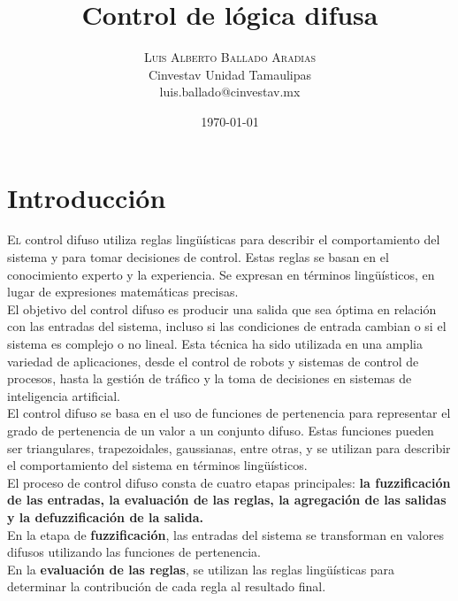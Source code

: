 \documentclass[oneside,onecolumn]{article}
\title{Control de lógica difusa} %
\author{%
\textsc{Luis Alberto Ballado Aradias} \\%
\normalsize Cinvestav Unidad Tamaulipas \\ %
\normalsize luis.ballado@cinvestav.mx %
}
\date{\today} %
\begin{document}
\maketitle

\section{Introducción}

\lettrine[nindent=0em,lines=3]{E}l control difuso utiliza reglas lingüísticas para describir el comportamiento del sistema y para tomar decisiones de control. Estas reglas se basan en el conocimiento experto y la experiencia. Se expresan en términos lingüísticos, en lugar de expresiones matemáticas precisas.\\

El objetivo del control difuso es producir una salida que sea óptima en relación con las entradas del sistema, incluso si las condiciones de entrada cambian o si el sistema es complejo o no lineal. Esta técnica ha sido utilizada en una amplia variedad de aplicaciones, desde el control de robots y sistemas de control de procesos, hasta la gestión de tráfico y la toma de decisiones en sistemas de inteligencia artificial.\\

El control difuso se basa en el uso de funciones de pertenencia para representar el grado de pertenencia de un valor a un conjunto difuso. Estas funciones pueden ser triangulares, trapezoidales, gaussianas, entre otras, y se utilizan para describir el comportamiento del sistema en términos lingüísticos.\\

El proceso de control difuso consta de cuatro etapas principales: \textbf{la fuzzificación de las entradas, la evaluación de las reglas, la agregación de las salidas y la defuzzificación de la salida.}\\

En la etapa de \textbf{fuzzificación}, las entradas del sistema se transforman en valores difusos utilizando las funciones de pertenencia.\\

En la \textbf{evaluación de las reglas}, se utilizan las reglas lingüísticas para determinar la contribución de cada regla al resultado final.\\
\end{document}
